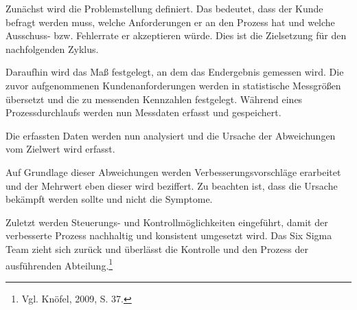             Zunächst wird die Problemstellung definiert. Das bedeutet, dass der Kunde befragt werden muss, welche Anforderungen er an den Prozess hat und welche Ausschuss- bzw. Fehlerrate er akzeptieren würde. Dies ist die Zielsetzung für den nachfolgenden Zyklus.

            Daraufhin wird das Maß festgelegt, an dem das Endergebnis gemessen wird. Die zuvor aufgenommenen Kundenanforderungen werden in statistische Messgrößen übersetzt und die zu messenden Kennzahlen festgelegt.
            Während eines Prozessdurchlaufs werden nun Messdaten erfasst und gespeichert.

            Die erfassten Daten werden nun analysiert und die Ursache der Abweichungen vom Zielwert wird erfasst.

            Auf Grundlage dieser Abweichungen werden Verbesserungsvorschläge erarbeitet und der Mehrwert eben dieser wird beziffert. Zu beachten ist, dass die Ursache bekämpft werden sollte und nicht die Symptome.

            Zuletzt werden Steuerungs- und Kontrollmöglichkeiten eingeführt, damit der verbesserte Prozess nachhaltig und konsistent umgesetzt wird. Das Six Sigma Team zieht sich zurück und überlässt die Kontrolle und den Prozess der ausführenden Abteilung.\footnote{Vgl. Knöfel, 2009, S. 37.} 